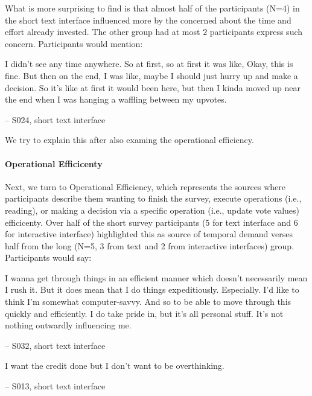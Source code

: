 What is more surprising to find is that almost half of the participants (N=4) in the short text interface influenced more by the concerned about the time and effort already invested. The other group had at most $2$ participants express such concern. Participants would mention:

\begin{displayquote}
I didn't see any time anywhere. So at first, so at first it was like, Okay, this is fine. But then on the end, I was like, maybe I should just hurry up and make a decision. So it's like at first it would been here, but then I kinda moved up near the end when I was hanging a waffling between my upvotes.
        
\noindent \hfill -- S024, short text interface
\end{displayquote}

We try to explain this after also examing the operational efficiency.

\paragraph{Operational Efficicenty}
Next, we turn to Operational Efficiency, which represents the sources where participants describe them wanting to finish the survey, execute operations (i.e., reading), or making a decision via a specific operation (i.e., update vote values) efficicenty. Over half of the short survey participants (5 for text interface and 6 for interactive interface) highlighted this as source of temporal demand verses half from the long (N=5, 3 from text and 2 from interactive interfaces) group. Participants would say:

\begin{displayquote}
I wanna get through things in an efficient manner which doesn't necessarily mean I rush it. But it does mean that I do things expeditiously. Especially. I'd like to think I'm somewhat computer-savvy. And so to be able to move through this quickly and efficiently. I do take pride in, but it's all personal stuff. It's not nothing outwardly influencing me. 
        
\noindent \hfill -- S032, short text interface
\end{displayquote}

\begin{displayquote}
I want the credit done but I don't want to be overthinking.
            
\noindent \hfill -- S013, short text interface
\end{displayquote}

